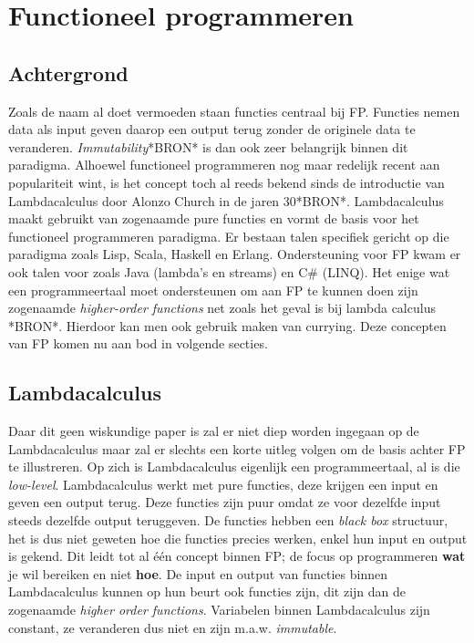 \section{Functioneel programmeren}
\subsection{Achtergrond}
Zoals de naam al doet vermoeden staan functies centraal bij FP. Functies nemen data als input geven daarop een output terug zonder de originele data te veranderen. \textit{Immutability}*BRON* is dan ook zeer belangrijk binnen dit paradigma. Alhoewel functioneel programmeren nog maar redelijk recent aan populariteit wint, is het concept toch al reeds bekend sinds de introductie van Lambdacalculus door Alonzo Church in de jaren 30*BRON*. Lambdacalculus maakt gebruikt van zogenaamde pure functies en vormt de basis voor het functioneel programmeren paradigma. Er bestaan talen specifiek gericht op die paradigma zoals Lisp, Scala, Haskell en Erlang. Ondersteuning voor FP kwam er ook talen voor zoals Java (lambda's en streams) en C\# (LINQ). Het enige wat een programmeertaal moet ondersteunen om aan FP te kunnen doen zijn zogenaamde \textit{higher-order functions} net zoals het geval is bij lambda calculus *BRON*. Hierdoor kan men ook gebruik maken van currying. Deze concepten van FP komen nu aan bod in volgende secties.

\subsection{Lambdacalculus}
Daar dit geen wiskundige paper is zal er niet diep worden ingegaan op de Lambdacalculus maar zal er slechts een korte uitleg volgen om de basis achter FP te illustreren. Op zich is Lambdacalculus eigenlijk een programmeertaal, al is die \textit{low-level}. Lambdacalculus werkt met pure functies, deze krijgen een input en geven een output terug. Deze functies zijn puur omdat ze voor dezelfde input steeds dezelfde output teruggeven. De functies hebben een \textit{black box} structuur, het is dus niet geweten hoe die functies precies werken, enkel hun input en output is gekend. Dit leidt tot al één concept binnen FP; de focus op programmeren \textbf{wat} je wil bereiken en niet \textbf{hoe}. De input en output van functies binnen Lambdacalculus kunnen op hun beurt ook functies zijn, dit zijn dan de zogenaamde \textit{higher order functions}. Variabelen binnen Lambdacalculus zijn constant, ze veranderen dus niet en zijn m.a.w. \textit{immutable}.

